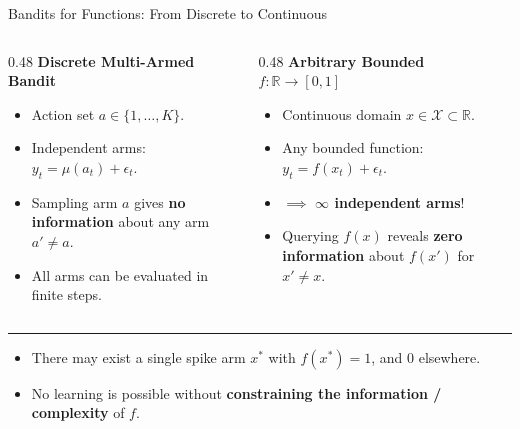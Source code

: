 \documentclass[18pt,aspectratio=149]{beamer}
\begin{document}
\begin{frame}{Bandits for Functions: From Discrete to Continuous}
    \small
    \begin{columns}[T,onlytextwidth]
        \begin{column}{0.48\textwidth}
            \textbf{Discrete Multi-Armed Bandit}
            \begin{itemize}
                \item Action set $a \in \{1, \dots, K\}$.
                \item Independent arms: $y_t = \mu(a_t) + \epsilon_t$.
                \item Sampling arm $a$ gives \textbf{no information} about any arm $a' \neq a$.
                \item All arms can be evaluated in finite steps.
            \end{itemize}
        \end{column}

        \begin{column}{0.48\textwidth}
            \textbf{Arbitrary Bounded $f: \mathbb{R} \to [0, 1]$}
            \begin{itemize}
                \item Continuous domain $x \in \mathcal{X} \subset \mathbb{R}$.
                \item Any bounded function: $y_t = f(x_t) + \epsilon_t$.
                \item $\implies$ \textbf{$\infty$ independent arms}!
                \item Querying $f(x)$ reveals \textbf{zero information} about $f(x')$ for $x' \neq x$.
            \end{itemize}
        \end{column}
    \end{columns}

    \vspace{0.25em}
    \hrule
    \vspace{0.2em}
    \pause
    \begin{itemize}
        \item There may exist a single spike arm $x^*$ with $f(x^*) = 1$, and $0$ elsewhere.
        \item No learning is possible without \textbf{constraining the information / complexity} of $f$.
    \end{itemize}
\end{frame}
\end{document}
